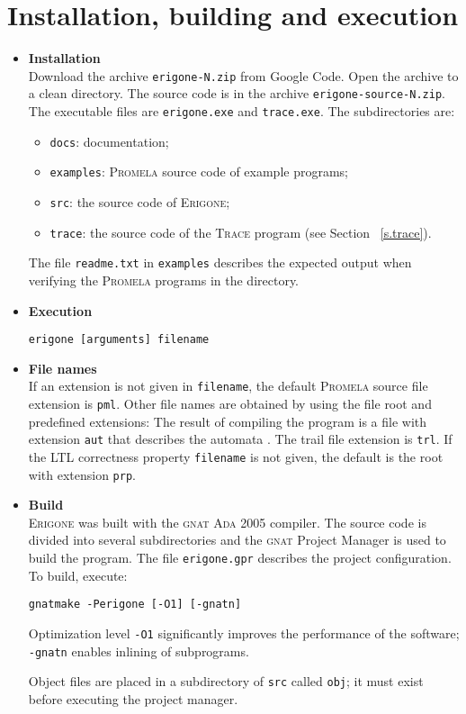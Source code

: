 \documentclass[11pt]{article}
\newcommand*{\prg}{\textsc{Erigone}}
\newcommand*{\trc}{\textsc{Trace}}
\newcommand*{\prm}{\textsc{Promela}}
\newcommand*{\ada}{\textsc{Ada 2005}}
\newcommand*{\gnat}{\textsc{gnat}}
\newcommand*{\p}[1]{\texttt{#1}}
\begin{document}
\section{Installation, building and execution}
\begin{itemize}
\item \textbf{Installation}\\Download the archive \p{erigone-N.zip}
from Google Code. Open the archive
to a clean directory. The source code is in the archive
\p{erigone-source-N.zip}. The executable files are \p{erigone.exe}
and \p{trace.exe}. The subdirectories are:
\begin{itemize}
\item \p{docs}: documentation;
\item \p{examples}: \prm{} source code of example programs;
\item \p{src}: the source code of \prg{};
\item \p{trace}: the source code of the \trc{} program  (see
Section ~\ref{s.trace}).
\end{itemize}
The file \p{readme.txt} in \p{examples} describes the expected output
when verifying the \prm{} programs in the directory.

\item \textbf{Execution}
\begin{verbatim}
erigone [arguments] filename
\end{verbatim}

\item \textbf{File names}\\
If an extension is not given in \p{filename}, the default \prm{} source
file extension is \p{pml}. Other file names are obtained by using the
file root and predefined extensions: The result of compiling the program
is a file with extension \p{aut} that describes the automata . The trail
file extension is \p{trl}. If the LTL correctness property \p{filename} is
not given, the default is the root with extension \p{prp}.

\item \textbf{Build}\\\prg{} was built with the \gnat{} \ada{} compiler.
The source code is divided into several subdirectories and the \gnat{}
Project Manager is used to build the program. The file \p{erigone.gpr}
describes the project configuration. To build, execute:
\begin{verbatim}
gnatmake -Perigone [-O1] [-gnatn]
\end{verbatim}
Optimization level \p{-O1} significantly improves the performance of the
software; \p{-gnatn} enables inlining of subprograms.

Object files are placed in a subdirectory of \p{src} called \p{obj}; it
must exist before executing the project manager.
\end{itemize}
\end{document}
